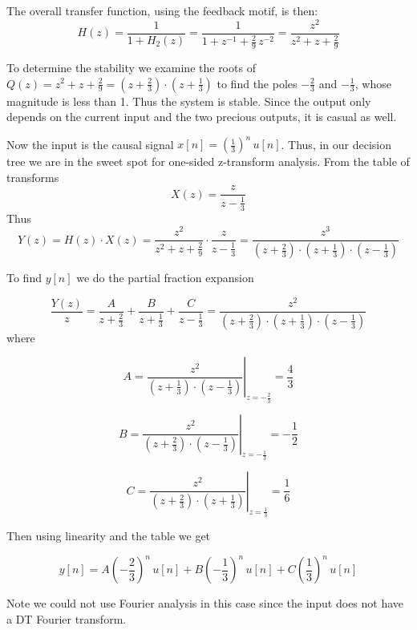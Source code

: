 \documentclass{article}
\begin{document}
The overall transfer function, using the feedback motif, is then:
\[
H(z) = \frac{1}{1 + H_2(z)} = \frac{1}{1 + z^{-1} + \frac{2}{9}\, z^{-2}} = \frac{z^2}{z^2 + z + \frac{2}{9}}
\]

To determine the stability we examine the roots of $Q(z) = z^2 + z + \frac{2}{9} = \left(z+\frac{2}{3} \right)\cdot \left(z+\frac{1}{3} \right)$ to find the poles $-\frac{2}{3}$ and $-\frac{1}{3}$, whose magnitude is less than 1. Thus the system is stable. Since the output only depends on the current input and the two precious outputs, it is casual as well.

Now the input is the causal signal $x[n] = \left(\frac{1}{3}\right)^n\, u[n]$. Thus, in our decision tree we are in the sweet spot for one-sided z-transform analysis. From the table of transforms
\[
X(z) = \frac{z}{z-\frac{1}{3}}
\]
Thus
\[
Y(z) = H(z)\cdot X(z) = \frac{z^2}{z^2 + z + \frac{2}{9}} \cdot \frac{z}{z-\frac{1}{3}} = \frac{z^3}{\left(z+\frac{2}{3}\right)\cdot \left(z+\frac{1}{3}\right) \cdot \left(z-\frac{1}{3}\right)}
\]

To find $y[n]$ we do the partial fraction expansion

\[
\frac{Y(z)}{z} = \frac{A}{z+\frac{2}{3}} + \frac{B}{z+\frac{1}{3}} + \frac{C}{z-\frac{1}{3}} = \frac{z^2}{\left(z+\frac{2}{3}\right)\cdot \left(z+\frac{1}{3}\right) \cdot \left(z-\frac{1}{3}\right)}
\]
where

\[
A = \left. \frac{z^2}{\left(z+\frac{1}{3}\right) \cdot \left(z-\frac{1}{3}\right)} \right|_{z= -\frac{2}{3}} = \frac{4}{3}
\]

\[
B = \left. \frac{z^2}{\left(z+\frac{2}{3}\right)\cdot \left(z-\frac{1}{3}\right)} \right|_{z= -\frac{1}{3}} = -\frac{1}{2} 
\]

\[
C = \left. \frac{z^2}{\left(z+\frac{2}{3}\right)\cdot \left(z+\frac{1}{3}\right)} \right|_{z=\frac{1}{3}} = \frac{1}{6}
\]

Then using linearity and the table we get

\[
y[n] = A\left(-\frac{2}{3}\right)^n\, u[n] + B\left(-\frac{1}{3}\right)^n\, u[n] + C\left(\frac{1}{3}\right)^n\, u[n] 
\]

Note we could not use Fourier analysis in this case since the input does not have a DT Fourier transform.
\end{document}
